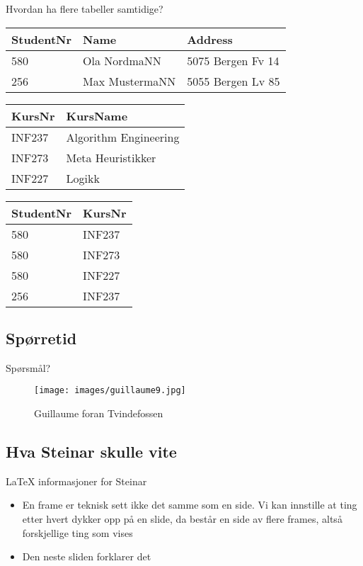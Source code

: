 \begin{frame}{Hvordan ha flere tabeller samtidige?}
\begin{tabular}{l|l|l}
 StudentNr & Name & Address\\\hline
 580 & Ola NordmaNN & 5075 Bergen Fv 14\\
 256 & Max MustermaNN & 5055 Bergen Lv 85\\
\end{tabular}
\vfill
\begin{tabular}{l|l}
KursNr & KursName \\\hline
INF237 & Algorithm Engineering\\
INF273 & Meta Heuristikker\\
INF227 & Logikk\\
\end{tabular}
\hfill
\begin{tabular}{l|l}
 StudentNr & KursNr\\\hline
 580 & INF237\\
 580 & INF273\\
 580 & INF227\\
 256 & INF237\\
\end{tabular}
\end{frame}

\subsection*{Spørretid}
\begin{frame}{Spørsmål?}
    \begin{figure}
        \centering
        \texttt{[image: images/guillaume9.jpg]}
        \caption{Guillaume foran Tvindefossen}
        \label{fig:guillaume9}
    \end{figure}
\end{frame}

\subsection*{Hva Steinar skulle vite}
\begin{frame}{LaTeX informasjoner for Steinar}
\begin{itemize}
    \item En frame er teknisk sett ikke det samme som en side. Vi kan innstille at ting etter hvert dykker opp på en slide, da består en side av flere frames, altså forskjellige ting som vises
    \item Den neste sliden forklarer det
\end{itemize}
\end{frame}

